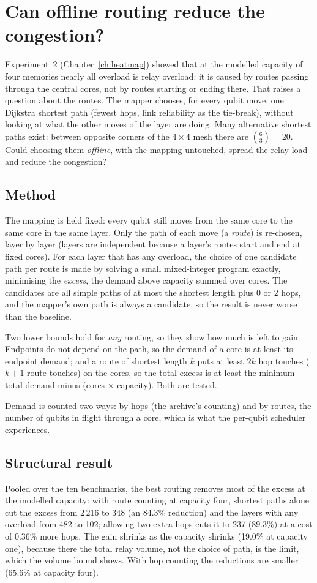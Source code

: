 \chapter{Can offline routing reduce the congestion?}
\label{ch:routing}

Experiment~2 (Chapter~\ref{ch:heatmap}) showed that at the modelled capacity of four memories nearly all overload is relay overload: it is caused by routes passing through the
central cores, not by routes starting or ending there. That raises a question about the routes. The mapper chooses, for every qubit move, one Dijkstra shortest path (fewest hops, link
reliability as the tie-break), without looking at what the other moves of the layer are doing. Many alternative shortest paths exist: between opposite corners of the $4\times4$ mesh there are
$\binom{6}{3}=20$. Could choosing them \emph{offline}, with the mapping untouched, spread the relay load and reduce the congestion?

\section{Method}
The mapping is held fixed: every qubit still moves from the same core to the same core in the same layer. Only the path of each move (a \emph{route}) is re-chosen, layer by layer
(layers are independent because a layer's routes start and end at fixed cores). For each layer that has any overload, the choice of one candidate path per route is made by solving a small
mixed-integer program exactly, minimising the \emph{excess}, the demand above capacity summed over cores. The candidates are all simple paths of at most the shortest length plus $0$ or $2$ hops,
and the mapper's own path is always a candidate, so the result is never worse than the baseline.

Two lower bounds hold for \emph{any} routing, so they show how much is left to gain. Endpoints do not depend on the path, so the demand of a core is at least its endpoint demand; and a route of shortest
length $k$ puts at least $2k$ hop touches ($k+1$ route touches) on the cores, so the total excess is at least the minimum total demand minus (cores $\times$ capacity). Both are tested.

Demand is counted two ways: by hops (the archive's counting) and by routes, the number of qubits in flight through a core, which is what the per-qubit scheduler experiences.

\section{Structural result}

Pooled over the ten benchmarks, the best routing removes most of the excess at the modelled capacity: with route counting at capacity four, shortest paths alone cut the excess from 2\,216 to 348 (an 84.3\% reduction)
and the layers with any overload from 482 to 102; allowing two extra hops cuts it to 237 (89.3\%) at a cost of 0.36\% more hops. The gain shrinks as the capacity shrinks (19.0\% at capacity one),
because there the total relay volume, not the choice of path, is the limit, which the volume bound shows. With hop counting the reductions are smaller (65.6\% at capacity four).

